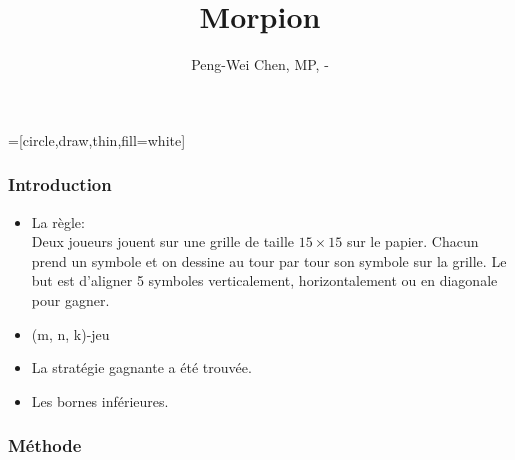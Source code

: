 \documentclass{beamer}
\title{Morpion}
\author{Peng-Wei Chen, MP, \oldstylenums{2017}-\oldstylenums{2018}}
\date{}
\begin{document}
=[circle,draw,thin,fill=white]

\begin{frame}
    \titlepage
\end{frame}

\begin{frame}
    \frametitle{Introduction}
    \begin{itemize}
        \item La règle:\\
Deux joueurs jouent sur une grille de taille $15 \times 15$ sur le papier. Chacun prend un symbole et on dessine au tour par tour son symbole sur la grille. Le but est d'aligner 5 symboles verticalement, horizontalement ou en diagonale pour gagner.
        \pause
        \item (m, n, k)-jeu
        \pause
        \item La stratégie gagnante a été trouvée.
        
        \pause
        \item Les bornes inférieures.
    \end{itemize}
    
\end{frame}


\begin{frame}
    \frametitle{Méthode}
\end{frame}
\end{document}
